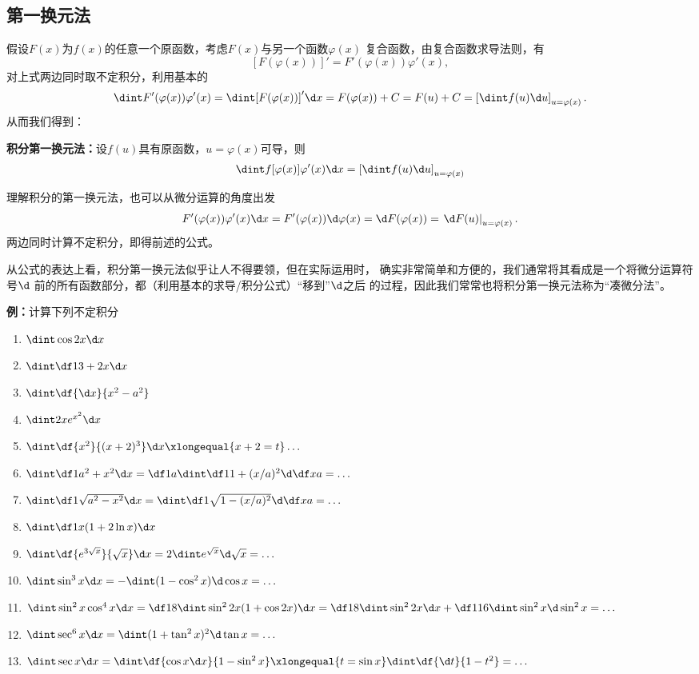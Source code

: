 \subsection{第一换元法}

假设$F(x)$为$f(x)$的任意一个原函数，考虑$F(x)$与另一个函数$\varphi(x)$
复合函数，由复合函数求导法则，有
$$[F(\varphi(x))]'=F'(\varphi(x))\varphi'(x),$$
对上式两边同时取不定积分，利用基本的
$$\dint F'(\varphi(x))\varphi'(x)
=\dint[F(\varphi(x))]'\d x=F(\varphi(x))+C=F(u)+C
=\left[\dint f(u)\d u\right]_{u=\varphi(x)}.
$$
从而我们得到：
\begin{thx}
	{\bf 积分第一换元法：}设$f(u)$具有原函数，$u=\varphi(x)$可导，则
	$$\dint f[\varphi(x)]\varphi'(x)\d x=\left[\dint f(u)
	\d u\right]_{u=\varphi(x)}$$
\end{thx}

理解积分的第一换元法，也可以从微分运算的角度出发
$$F'(\varphi(x))\varphi'(x)\d x
=F'(\varphi(x))\d\varphi(x)
=\d F(\varphi(x))=\left.\d F(u)\right|_{u=\varphi(x)}.$$
两边同时计算不定积分，即得前述的公式。

从公式的表达上看，积分第一换元法似乎让人不得要领，但在实际运用时，
确实非常简单和方便的，我们通常将其看成是一个将微分运算符号$\d$
前的所有函数部分，都（利用基本的求导/积分公式）“移到”$\d$之后
的过程，因此我们常常也将积分第一换元法称为{\kaishu “凑微分法”}。

{\bf 例：}计算下列不定积分
\begin{enumerate}[(1)]
  \setlength{\itemindent}{1cm}
  \item $\dint\cos 2x\d x$ 
  \item $\dint\df 1{3+2x}\d x$
  \item $\dint\df{\d x}{x^2-a^2}$
  \item $\dint 2xe^{x^2}\d x$ 
  \item $\dint\df{x^2}{(x+2)^3}\d x\xlongequal{x+2=t}\ldots$ 
  \item $\dint\df 1{a^2+x^2}\d x=\df1a\dint\df1{1+(x/a)^2}\d\df xa=\ldots$ 
  \item $\dint\df 1{\sqrt{a^2-x^2}}\d x=\dint\df1{\sqrt{1-(x/a)^2}}\d\df
  xa=\ldots$
  \item $\dint \df 1{x(1+2\ln x)}\d x$ 
  \item $\dint\df {e^{3\sqrt x}}{\sqrt x}\d x=2\dint e^{\sqrt x}\d\sqrt x=\ldots$ 
  \item $\dint \sin^3x\d x=-\dint(1-\cos^2x)\d\cos x=\ldots$ 
  \item $\dint \sin^2x\cos^4x\d x=\df18\dint\sin^22x(1+\cos2x)\d x
  =\df18\dint\sin^22x\d x+\df1{16}\dint\sin^2x\d\sin^2x=\ldots$ 
  \item $\dint\sec^6x\d x=\dint(1+\tan^2 x)^2\d\tan x=\ldots$ 
  \item $\dint\sec x\d x=\dint\df{\cos x\d x}{1-\sin^2x}
  \xlongequal{t=\sin x}\dint\df{\d t}{1-t^2}=\ldots$
\end{enumerate}

